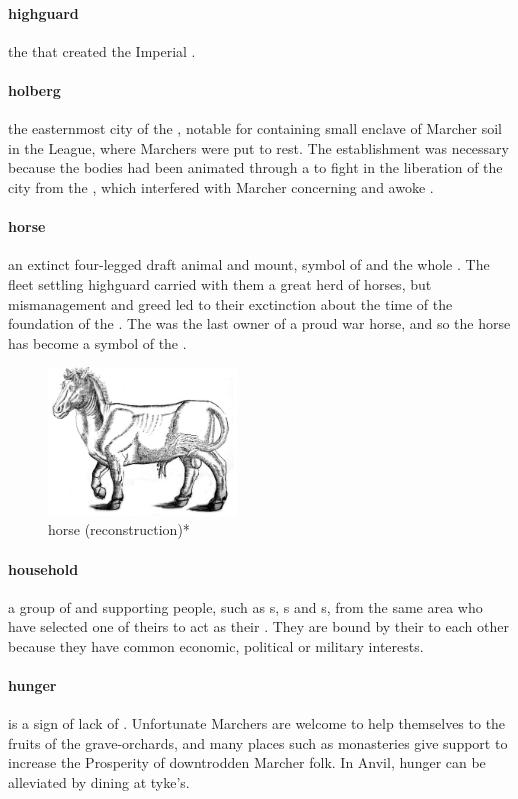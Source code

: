 \paragraph{highguard} the  that created the Imperial .
\paragraph{holberg} the easternmost city of the , notable for containing small enclave of Marcher soil in the League, where Marchers were put to rest. The establishment was necessary because the bodies had been animated through a   to fight in the liberation of the city from the , which interfered with Marcher  concerning  and awoke .
\paragraph{horse} an extinct four-legged draft animal and mount, symbol of  and the whole . The fleet settling highguard carried with them a great herd of horses, but mismanagement and greed led to their exctinction about the time of the foundation of the . The  was the last owner of a proud war horse, and so the horse has become a symbol of the .\begin{figure}\centering\includegraphics[width=5cm]{encyclopedia/Horse}\caption{horse (reconstruction)*}\end{figure}
\paragraph{household} a group of  and supporting people, such as s, s and s, from the same area who have selected one of theirs to act as their . They are bound by their  to each other because they have common economic, political or military interests.
\paragraph{hunger} is a sign of lack of . Unfortunate Marchers are welcome to help themselves to the fruits of the grave-orchards, and many places such as monasteries give support to increase the Prosperity of downtrodden Marcher folk. In Anvil, hunger can be alleviated by dining at tyke’s.
